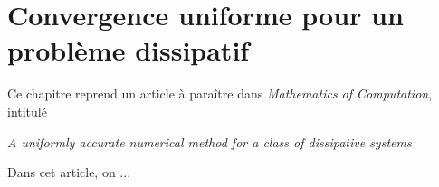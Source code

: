 
\clearemptydoublepage
\chapter{Convergence uniforme pour un problème dissipatif}

Ce chapitre reprend un article à paraître dans \textit{Mathematics of
Computation}, intitulé 
\begin{center}\itshape%
  A uniformly accurate numerical method for a class of dissipative
  systems
\end{center}
Dans cet article, on ...





















